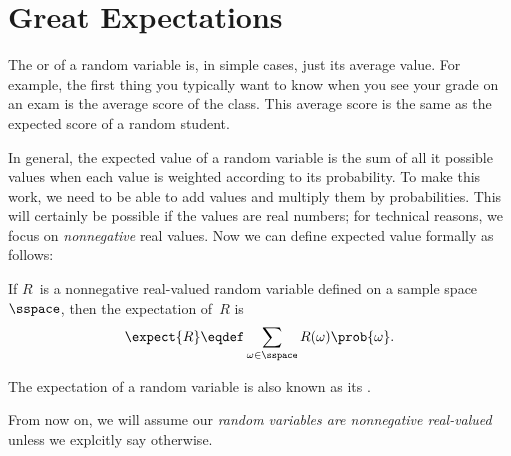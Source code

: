 \begin{problems}
\practiceproblems
{}

\classproblems
{}

\homeworkproblems
\end{problems}


\section{Great Expectations}\label{expectation_sec}

The  or  of a random variable
is, in simple cases, just its average value.  For example, the first
thing you typically want to know when you see your grade on an exam is
the average score of the class.  This average score is the same as the
expected score of a random student.

In general, the expected value of a random variable is the sum of all
it possible values when each value is weighted according to its
probability.  To make this work, we need to be able to add values and
multiply them by probabilities.  This will certainly be possible if
the values are real numbers; for technical reasons, we focus on
\emph{nonnegative} real values.  Now we can define expected value
formally as follows:
\begin{definition}\label{def:expectation}
If $R$~is a nonnegative real-valued random variable defined on a
sample space~$\sspace$, then the expectation of~$R$ is
\begin{equation}\label{eqn:expectation}
    \expect{R} \eqdef \sum_{\omega \in \sspace} R(\omega) \prob{\omega}.
\end{equation}
\end{definition}
The expectation of a random variable is also known as its .

From now on, we will assume our \emph{random variables are nonnegative
  real-valued} unless we explcitly say otherwise.

